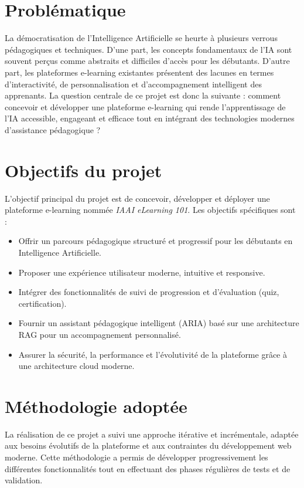 \documentclass[12pt, a4paper]{report}
\begin{document}
\section{Problématique}
La démocratisation de l'Intelligence Artificielle se heurte à plusieurs verrous
pédagogiques et techniques. D'une part, les concepts fondamentaux de l'IA sont
souvent perçus comme abstraits et difficiles d'accès pour les débutants. D'autre
part, les plateformes e-learning existantes présentent des lacunes en termes
d'interactivité, de personnalisation et d'accompagnement intelligent des apprenants.
La question centrale de ce projet est donc la suivante : comment concevoir et
développer une plateforme e-learning qui rende l'apprentissage de l'IA accessible,
engageant et efficace tout en intégrant des technologies modernes d'assistance
pédagogique ?

\section{Objectifs du projet}
L'objectif principal du projet est de concevoir, développer et déployer une
plateforme e-learning nommée \textit{IAAI eLearning 101}. Les objectifs spécifiques
sont :
\begin{itemize}
    \item Offrir un parcours pédagogique structuré et progressif pour les débutants
    en Intelligence Artificielle.
    \item Proposer une expérience utilisateur moderne, intuitive et responsive.
    \item Intégrer des fonctionnalités de suivi de progression et d'évaluation
    (quiz, certification).
    \item Fournir un assistant pédagogique intelligent (ARIA) basé sur une
    architecture RAG pour un accompagnement personnalisé.
    \item Assurer la sécurité, la performance et l'évolutivité de la plateforme
    grâce à une architecture cloud moderne.
\end{itemize}

\section{Méthodologie adoptée}

La réalisation de ce projet a suivi une approche itérative et incrémentale, adaptée aux besoins évolutifs de la plateforme et aux contraintes du développement web moderne. Cette méthodologie a permis de développer progressivement les différentes fonctionnalités tout en effectuant des phases régulières de tests et de validation.
\end{document}
